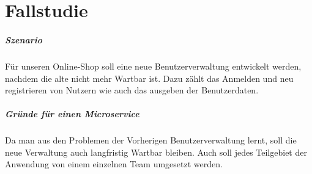 \chapter{Fallstudie}\label{ch:Fallstudie}
\paragraph{Szenario}
Für unseren Online-Shop soll eine neue Benutzerverwaltung entwickelt werden, nachdem die alte nicht mehr Wartbar ist. Dazu zählt das Anmelden und neu registrieren von Nutzern wie auch das ausgeben der Benutzerdaten.

\paragraph{Gründe für einen Microservice}
Da man aus den Problemen der Vorherigen Benutzerverwaltung lernt, soll die neue Verwaltung auch langfristig Wartbar bleiben. \newline
Auch soll jedes Teilgebiet der Anwendung von einem einzelnen Team umgesetzt werden.